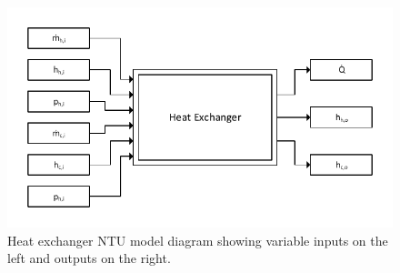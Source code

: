 \begin{figure}[h]
	\centering

	\includegraphics[width=\textwidth]{figures/HeatExBlock.pdf} 

	\caption{Heat exchanger NTU model diagram showing variable inputs on the left and outputs on the right.}
	\label{fig:heatexblock_label}

\end{figure}